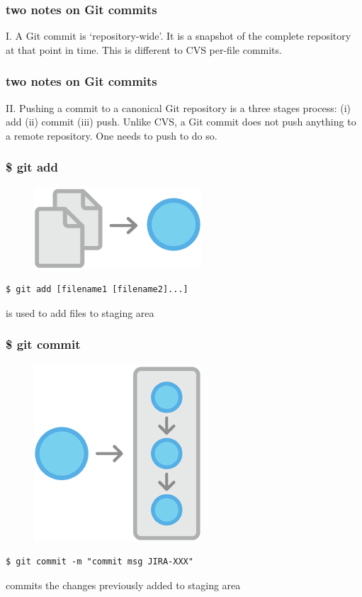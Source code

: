 \documentclass{beamer}
\begin{document}
\begin{frame}
    \frametitle{two notes on Git commits}
    I. A Git commit is `repository-wide'. It is a snapshot
    of the complete repository at that point in time. This
    is different to CVS per-file commits.
\end{frame}

\begin{frame}
    \frametitle{two notes on Git commits}
    II. Pushing a commit to a canonical Git repository
    is a three stages process: (i) add (ii) commit (iii) push.
    Unlike CVS, a Git commit does not push anything to a remote
    repository. One needs to push to do so.
\end{frame}

\begin{frame}[fragile]
    \frametitle{\$ git add}
    \begin{figure}[h!]
        \begin{center}
            \includegraphics[scale=0.7]{add.png}
        \end{center}
    \end{figure}
    \begin{verbatim}
$ git add [filename1 [filename2]...]
    \end{verbatim}
    is used to add files to staging area
\end{frame}

\begin{frame}[fragile]
    \frametitle{\$ git commit}
    \begin{figure}[h!]
        \begin{center}
            \includegraphics[scale=0.7]{commit.png}
        \end{center}
    \end{figure}
    \begin{verbatim}
$ git commit -m "commit msg JIRA-XXX"
    \end{verbatim}
    commits the changes previously added to staging area
\end{frame}
\end{document}
